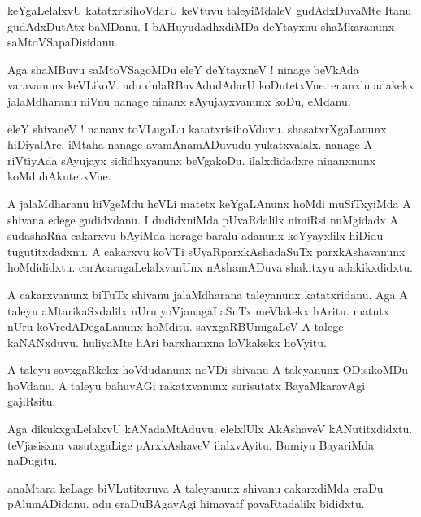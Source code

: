 \documentclass{article}
\begin{document}
\begin{mn}%
keYgaLelalxvU katatxrisihoVdarU keVtuvu taleyiMdaleV gudAdxDuvaMte Itanu gudAdxDutAtx 
baMDanu. I bAHuyudadhxdiMDa deYtayxnu shaMkaranunx saMtoVSapaDisidanu.
\end{mn}

\begin{mn}%
Aga shaMBuvu saMtoVSagoMDu eleY deYtayxneV ! ninage beVkAda varavanunx keVLikoV. adu 
dulaRBavAdudAdarU koDutetxVne. enanxlu adakekx jalaMdharanu niVnu nanage ninanx 
sAyujayxvanunx koDu, eMdanu.
\end{mn}

\begin{mn}%
eleY shivaneV ! nananx toVLugaLu katatxrisihoVduvu. shasatxrXgaLanunx hiDiyalAre. iMtaha 
nanage avamAnamADuvudu yukatxvalalx. nanage A riVtiyAda sAyujayx sididhxyanunx beVgakoDu. 
ilalxdidadxre ninanxnunx koMduhAkutetxVne.
\end{mn}

\begin{mn}%
A jalaMdharanu hiVgeMdu heVLi matetx keYgaLAnunx hoMdi muSiTxyiMda A shivana edege 
gudidxdanu. I dudidxniMda pUvaRdalilx nimiRsi nuMgidadx A sudashaRna cakarxvu bAyiMda 
horage baralu adanunx keYyayxlilx hiDidu tugutitxdadxnu. A cakarxvu koVTi 
sUyaRparxkAshadaSuTx parxkAshavanunx hoMdididxtu. carAcaragaLelalxvanUnx nAshamADuva 
shakitxyu adakikxdidxtu.
\end{mn}

\begin{mn}%
A cakarxvanunx biTuTx shivanu jalaMdharana taleyanunx katatxridanu. Aga A taleyu 
aMtarikaSxdalilx nUru yoVjanagaLaSuTx meVlakekx hAritu. matutx nUru koVredADegaLanunx 
hoMditu. savxgaRBUmigaLeV A talege kaNANxduvu. huliyaMte hAri barxhamxna loVkakekx hoVyitu.
\end{mn}

\begin{mn}%
A taleyu savxgaRkekx hoVdudanunx noVDi shivanu A taleyanunx ODisikoMDu hoVdanu. A taleyu 
bahuvAGi rakatxvanunx surisutatx BayaMkaravAgi gajiRsitu.
\end{mn}

\begin{mn}%
Aga dikukxgaLelalxvU kANadaMtAduvu. elelxlUlx AkAshaveV kANutitxdidxtu. teVjasisxna 
vasutxgaLige pArxkAshaveV ilalxvAyitu. Bumiyu BayariMda naDugitu.
\end{mn}

\begin{mn}%
anaMtara keLage biVLutitxruva A taleyanunx shivanu cakarxdiMda eraDu pAlumADidanu. adu 
eraDuBAgavAgi himavatf pavaRtadalilx bididxtu.
\end{mn}
\end{document}
